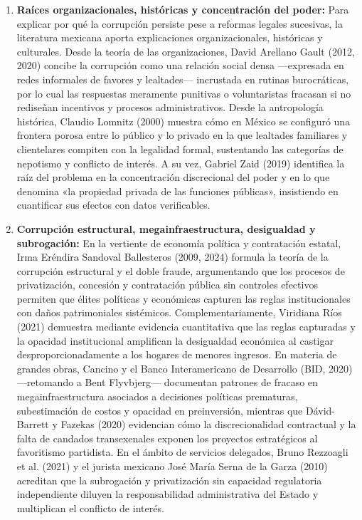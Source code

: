 \begin{enumerate}
  \item \textbf{Raíces organizacionales, históricas y concentración del poder:} Para explicar por qué la corrupción persiste pese a reformas legales sucesivas, la literatura mexicana aporta explicaciones organizacionales, históricas y culturales. Desde la teoría de las organizaciones, David Arellano Gault (2012, 2020) concibe la corrupción como una relación social densa ---expresada en redes informales de favores y lealtades--- incrustada en rutinas burocráticas, por lo cual las respuestas meramente punitivas o voluntaristas fracasan si no rediseñan incentivos y procesos administrativos. Desde la antropología histórica, Claudio Lomnitz (2000) muestra cómo en México se configuró una frontera porosa entre lo público y lo privado en la que lealtades familiares y clientelares compiten con la legalidad formal, sustentando las categorías de nepotismo y conflicto de interés. A su vez, Gabriel Zaid (2019) identifica la raíz del problema en la concentración discrecional del poder y en lo que denomina «la propiedad privada de las funciones públicas», insistiendo en cuantificar sus efectos con datos verificables.

  \item \textbf{Corrupción estructural, megainfraestructura, desigualdad y subrogación:} En la vertiente de economía política y contratación estatal, Irma Eréndira Sandoval Ballesteros (2009, 2024) formula la teoría de la corrupción estructural y el doble fraude, argumentando que los procesos de privatización, concesión y contratación pública sin controles efectivos permiten que élites políticas y económicas capturen las reglas institucionales con daños patrimoniales sistémicos. Complementariamente, Viridiana Ríos (2021) demuestra mediante evidencia cuantitativa que las reglas capturadas y la opacidad institucional amplifican la desigualdad económica al castigar desproporcionadamente a los hogares de menores ingresos. En materia de grandes obras, Cancino y el Banco Interamericano de Desarrollo (BID, 2020) ---retomando a Bent Flyvbjerg--- documentan patrones de fracaso en megainfraestructura asociados a decisiones políticas prematuras, subestimación de costos y opacidad en preinversión, mientras que Dávid-Barrett y Fazekas (2020) evidencian cómo la discrecionalidad contractual y la falta de candados transexenales exponen los proyectos estratégicos al favoritismo partidista. En el ámbito de servicios delegados, Bruno Rezzoagli et al. (2021) y el jurista mexicano José María Serna de la Garza (2010) acreditan que la subrogación y privatización sin capacidad regulatoria independiente diluyen la responsabilidad administrativa del Estado y multiplican el conflicto de interés.


\end{enumerate}
